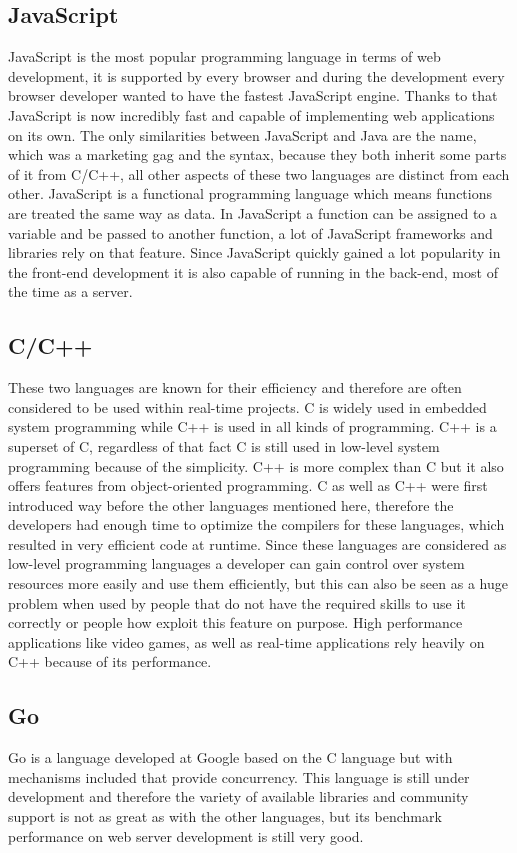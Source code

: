 \subsection{JavaScript}
JavaScript is the most popular programming language in terms of web development, it is supported by every browser and during the development every browser developer wanted to have the fastest JavaScript engine. Thanks to that JavaScript is now incredibly fast and capable of implementing web applications on its own. The only similarities between JavaScript and Java are the name, which was a marketing gag and the syntax, because they both inherit some parts of it from C/C++, all other aspects of these two languages are distinct from each other. JavaScript is a functional programming language which means functions are treated the same way as data. In JavaScript a function can be assigned to a variable and be passed to another function, a lot of JavaScript frameworks and libraries rely on that feature. Since JavaScript quickly gained a lot popularity in the front-end development it is also capable of running in the back-end, most of the time as a  server.

\subsection{C/C++}
These two languages are known for their efficiency and therefore are often considered to be used within real-time projects. C is widely used in embedded system programming while C++ is used in all kinds of programming. C++ is a superset of C, regardless of that fact C is still used in low-level system programming because of the simplicity. C++ is more complex than C but it also offers features from object-oriented programming. C as well as C++ were first introduced way before the other languages mentioned here, therefore the developers had enough time to optimize the compilers for these languages, which resulted in very efficient code at runtime. Since these languages are considered as low-level programming languages a developer can gain control over system resources more easily and use them efficiently, but this can also be seen as a huge problem when used by people that do not have the required skills to use it correctly or people how exploit this feature on purpose. High performance applications like video games, as well as real-time applications rely heavily on C++ because of its performance.

\subsection{Go}
Go is a language developed at Google based on the C language but with mechanisms included that provide concurrency. This language is still under development and therefore the variety of available libraries and community support is not as great as with the other languages, but its benchmark performance on web server development is still very good.

